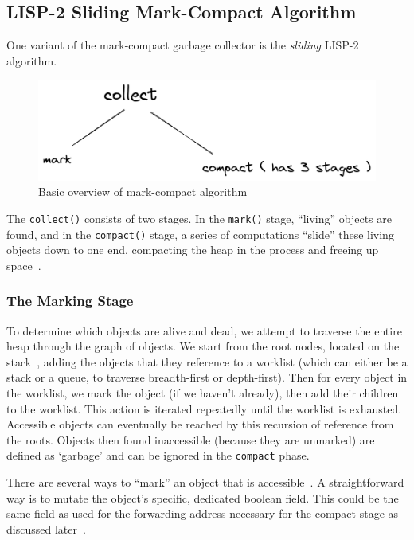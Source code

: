 \documentclass[index]{subfiles}
\begin{document}
\subsection{LISP-2 Sliding Mark-Compact Algorithm}

One variant of the mark-compact garbage collector is the \textit{sliding} LISP-2 algorithm.

\begin{figure}[H]
    \centering
    \includegraphics[scale=0.14]{pics/mark-compact-overview.png}
    \caption{Basic overview of mark-compact algorithm}
\end{figure}

The \verb+collect()+ consists of two stages. In the \verb+mark()+ stage, ``living'' objects are found, and in the \verb+compact()+ stage, a series of computations ``slide'' these living objects down to one end, compacting the heap in the process and freeing up space~\parencite[Chapter~3]{gc_handbook}.

\subsubsection{The Marking Stage}

To determine which objects are alive and dead, we attempt to traverse the entire heap through the graph of objects. We start from the root nodes, located on the stack~\parencites[Chapter~3~Marking]{redhat_openjdk}[Chapter~3]{gc_handbook}, adding the objects that they reference to a worklist (which can either be a stack or a queue, to traverse breadth-first or depth-first). Then for every object in the worklist, we mark the object (if we haven't already), then add their children to the worklist. This action is iterated repeatedly until the worklist is exhausted. Accessible objects can eventually be reached by this recursion of reference from the roots. Objects then found inaccessible (because they are unmarked) are defined as `garbage' and can be ignored in the \verb+compact+ phase.

There are several ways to ``mark'' an object that is accessible~\parencite[Chapter~3]{gc_handbook}. A straightforward way is to mutate the object's specific, dedicated boolean field. This could be the same field as used for the forwarding address necessary for the compact stage as discussed later~\parencite[Chapter~1]{gc_handbook}.
\end{document}
